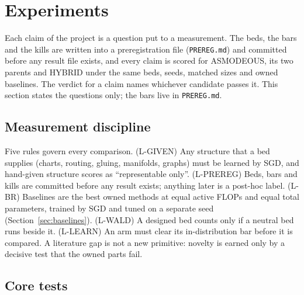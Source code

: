 \section{Experiments}\label{sec:experiments}

Each claim of the project is a question put to a measurement. The beds, the bars and the kills are written into a preregistration file (\texttt{PREREG.md}) and committed before any result file exists, and every claim is scored for ASMODEOUS, its two parents and HYBRID under the same beds, seeds, matched sizes and owned baselines. The verdict for a claim names whichever candidate passes it. This section states the questions only; the bars live in \texttt{PREREG.md}.

\subsection{Measurement discipline}

Five rules govern every comparison. (L-GIVEN) Any structure that a bed supplies (charts, routing, gluing, manifolds, graphs) must be learned by SGD, and hand-given structure scores as ``representable only''. (L-PREREG) Beds, bars and kills are committed before any result exists; anything later is a post-hoc label. (L-BR) Baselines are the best owned methods at equal active FLOPs and equal total parameters, trained by SGD and tuned on a separate seed (Section~\ref{sec:baselines}). (L-WALD) A designed bed counts only if a neutral bed runs beside it. (L-LEARN) An arm must clear its in-distribution bar before it is compared. A literature gap is not a new primitive: novelty is earned only by a decisive test that the owned parts fail.

\subsection{Core tests}

